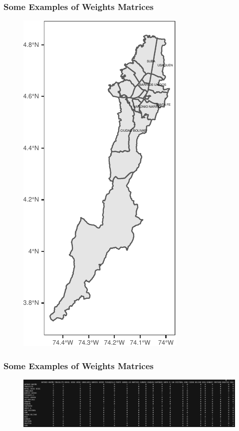\documentclass[
  shownotes,
  xcolor={svgnames},
  hyperref={colorlinks,citecolor=DarkBlue,linkcolor=DarkRed,urlcolor=DarkBlue}
   , aspectratio=169]{beamer}
\begin{document}
\begin{frame}[fragile]
\frametitle{Some Examples of Weights Matrices}


  \begin{figure}[H] \centering
    \captionsetup{justification=centering}
    \includegraphics[scale=0.6]{figures/localities.pdf}
   \end{figure}

\end{frame}

\begin{frame}[fragile]
\frametitle{Some Examples of Weights Matrices}

  \begin{figure}[H] \centering
    \captionsetup{justification=centering}
    \includegraphics[scale=0.35]{figures/matrix_loc}
   \end{figure}

\end{frame}
\end{document}
